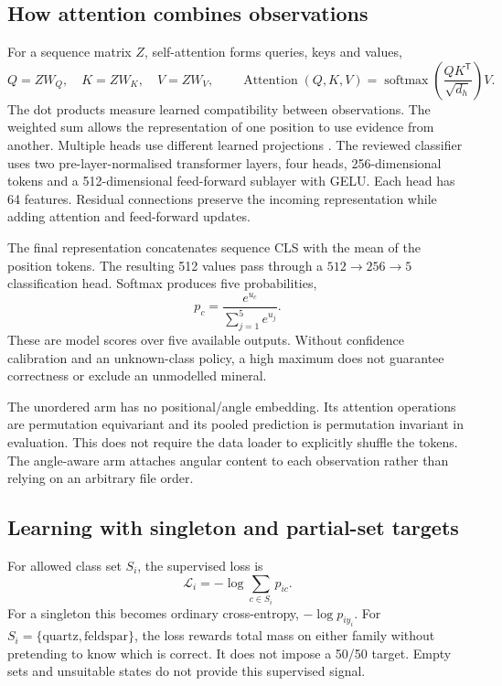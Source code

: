 \subsection{How attention combines observations}
For a sequence matrix $Z$, self-attention forms queries, keys and values,
\begin{equation}
Q=ZW_Q,\quad K=ZW_K,\quad V=ZW_V,\qquad
\operatorname{Attention}(Q,K,V)=\operatorname{softmax}\left(\frac{QK^{\mathsf T}}{\sqrt{d_h}}\right)V.
\end{equation}
The dot products measure learned compatibility between observations. The weighted sum allows the representation of one position to use evidence from another. Multiple heads use different learned projections \cite{attention}. The reviewed classifier uses two pre-layer-normalised transformer layers, four heads, 256-dimensional tokens and a 512-dimensional feed-forward sublayer with GELU. Each head has 64 features. Residual connections preserve the incoming representation while adding attention and feed-forward updates.

The final representation concatenates sequence CLS with the mean of the position tokens. The resulting 512 values pass through a $512\to256\to5$ classification head. Softmax produces five probabilities,
\begin{equation}
p_c=\frac{e^{u_c}}{\sum_{j=1}^{5}e^{u_j}}.
\end{equation}
These are model scores over five available outputs. Without confidence calibration and an unknown-class policy, a high maximum does not guarantee correctness or exclude an unmodelled mineral.

The unordered arm has no positional/angle embedding. Its attention operations are permutation equivariant and its pooled prediction is permutation invariant in evaluation. This does not require the data loader to explicitly shuffle the tokens. The angle-aware arm attaches angular content to each observation rather than relying on an arbitrary file order.

\subsection{Learning with singleton and partial-set targets}
For allowed class set $S_i$, the supervised loss is
\begin{equation}\label{eq:setloss}
\mathcal L_i=-\log\sum_{c\in S_i}p_{ic}.
\end{equation}
For a singleton this becomes ordinary cross-entropy, $-\log p_{iy_i}$. For $S_i=\{\text{quartz},\text{feldspar}\}$, the loss rewards total mass on either family without pretending to know which is correct. It does not impose a 50/50 target. Empty sets and unsuitable states do not provide this supervised signal.

